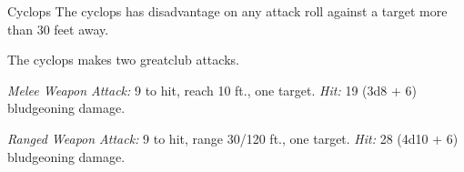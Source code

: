 \documentclass[10pt,a4paper,twoside,bg=print,twocolumn,openany,nodeprecatedcode]{dndbook}
\begin{document}
\begin{DndMonster}[float=t]{Cyclops}
\DndMonsterBasics[
armor-class = {14 (natural armor)},
hit-points = {\DndDice{12d12 + 60}},
speed = {30 ft.}
]
\DndMonsterAbilityScores[
 str = 22,
 dex = 11,
 con = 20,
 int = 8,
 wis = 6,
 cha = 10
]
\DndMonsterDetails[
languages = {Giant},
challenge = 6,
]
The cyclops has disadvantage on any attack roll against a target more than 30 feet away.

The cyclops makes two greatclub attacks.

\textsl{Melee Weapon Attack:} 9 to hit, reach 10 ft., one target. \textsl{Hit:} 19 (3d8 + 6) bludgeoning damage.

\textsl{Ranged Weapon Attack:} 9 to hit, range 30/120 ft., one target. \textsl{Hit:} 28 (4d10 + 6) bludgeoning damage.

\end{DndMonster}
\end{document}
